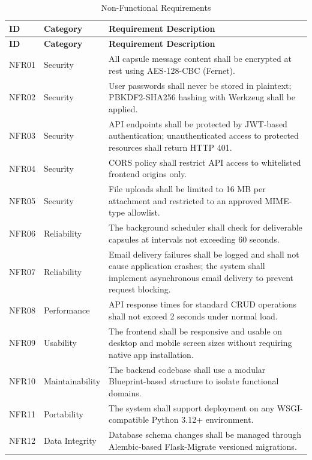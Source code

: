 \documentclass[12pt, a4paper]{article}
\begin{document}
\begin{longtable}{|p{0.8cm}|p{2.8cm}|p{9cm}|}
\caption{Non-Functional Requirements}
\label{tab:nonfunctional_req}\\
\hline
\textbf{ID} & \textbf{Category} & \textbf{Requirement Description} \\
\hline
\endfirsthead
\hline
\textbf{ID} & \textbf{Category} & \textbf{Requirement Description} \\
\hline
\endhead
\hline
NFR01 & Security & All capsule message content shall be encrypted at rest using AES-128-CBC (Fernet). \\
\hline
NFR02 & Security & User passwords shall never be stored in plaintext; PBKDF2-SHA256 hashing with Werkzeug shall be applied. \\
\hline
NFR03 & Security & API endpoints shall be protected by JWT-based authentication; unauthenticated access to protected resources shall return HTTP 401. \\
\hline
NFR04 & Security & CORS policy shall restrict API access to whitelisted frontend origins only. \\
\hline
NFR05 & Security & File uploads shall be limited to 16 MB per attachment and restricted to an approved MIME-type allowlist. \\
\hline
NFR06 & Reliability & The background scheduler shall check for deliverable capsules at intervals not exceeding 60 seconds. \\
\hline
NFR07 & Reliability & Email delivery failures shall be logged and shall not cause application crashes; the system shall implement asynchronous email delivery to prevent request blocking. \\
\hline
NFR08 & Performance & API response times for standard CRUD operations shall not exceed 2 seconds under normal load. \\
\hline
NFR09 & Usability & The frontend shall be responsive and usable on desktop and mobile screen sizes without requiring native app installation. \\
\hline
NFR10 & Maintainability & The backend codebase shall use a modular Blueprint-based structure to isolate functional domains. \\
\hline
NFR11 & Portability & The system shall support deployment on any WSGI-compatible Python 3.12+ environment. \\
\hline
NFR12 & Data Integrity & Database schema changes shall be managed through Alembic-based Flask-Migrate versioned migrations. \\
\hline
\end{longtable}
\end{document}

